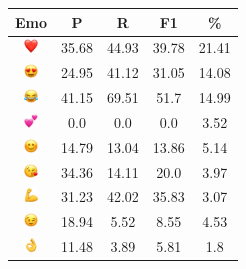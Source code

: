\documentclass{article}
\begin{document}
\begin{table}
\centering
\begin{tabular}{|c|ccc|c|} \hline
\textbf{Emo} & \textbf{P} & \textbf{R} & \textbf{F1} & \textbf{\%} \\ \hline
\includegraphics[height=0.37cm,width=0.37cm]{img/red_heart.png} & 35.68 & 44.93 & 39.78 & 21.41\\ 
\includegraphics[height=0.37cm,width=0.37cm]{img/smiling_face_with_hearteyes.png} & 24.95 & 41.12 & 31.05 & 14.08\\ 
\includegraphics[height=0.37cm,width=0.37cm]{img/face_with_tears_of_joy.png} & 41.15 & 69.51 & 51.7 & 14.99\\ 
\includegraphics[height=0.37cm,width=0.37cm]{img/two_hearts.png} & 0.0 & 0.0 & 0.0 & 3.52\\ 
\includegraphics[height=0.37cm,width=0.37cm]{img/smiling_face_with_smiling_eyes.png} & 14.79 & 13.04 & 13.86 & 5.14\\ 
\includegraphics[height=0.37cm,width=0.37cm]{img/face_blowing_a_kiss.png} & 34.36 & 14.11 & 20.0 & 3.97\\ 
\includegraphics[height=0.37cm,width=0.37cm]{img/flexed_biceps.png} & 31.23 & 42.02 & 35.83 & 3.07\\ 
\includegraphics[height=0.37cm,width=0.37cm]{img/winking_face.png} & 18.94 & 5.52 & 8.55 & 4.53\\ 
\includegraphics[height=0.37cm,width=0.37cm]{img/OK_hand.png} & 11.48 & 3.89 & 5.81 & 1.8\\ 

\end{tabular}
\end{table}
\end{document}
